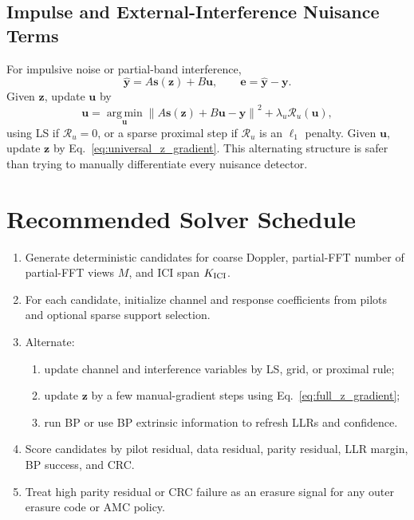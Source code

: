 \documentclass[11pt]{article}
\newcommand{\norm}[1]{\left\lVert #1 \right\rVert}
\newcommand{\argmin}{\operatorname*{arg\,min}}
\begin{document}
\subsection{Impulse and External-Interference Nuisance Terms}

For impulsive noise or partial-band interference,
\begin{equation}
  \widehat{\bm y}=A\bm s(\bm z)+B\bm u,\qquad
  \bm e=\widehat{\bm y}-\bm y.
\end{equation}
Given $\bm z$, update $\bm u$ by
\begin{equation}
  \bm u
  =
  \argmin_{\bm u}\norm{A\bm s(\bm z)+B\bm u-\bm y}^2
  +\lambda_u\mathcal R_u(\bm u),
\end{equation}
using LS if $\mathcal R_u=0$, or a sparse proximal step if $\mathcal R_u$ is an
$\ell_1$ penalty.  Given $\bm u$, update $\bm z$ by
Eq.~\eqref{eq:universal_z_gradient}.  This alternating structure is safer than
trying to manually differentiate every nuisance detector.

\section{Recommended Solver Schedule}

\begin{enumerate}
  \item Generate deterministic candidates for coarse Doppler, partial-FFT
  number of partial-FFT views $M$, and ICI span $K_{\rm ICI}$.
  \item For each candidate, initialize channel and response coefficients from pilots
  and optional sparse support selection.
  \item Alternate:
  \begin{enumerate}
    \item update channel and interference variables by LS, grid, or proximal
    rule;
    \item update $\bm z$ by a few manual-gradient steps using
    Eq.~\eqref{eq:full_z_gradient};
    \item run BP or use BP extrinsic information to refresh LLRs and confidence.
  \end{enumerate}
  \item Score candidates by pilot residual, data residual, parity residual,
  LLR margin, BP success, and CRC.
  \item Treat high parity residual or CRC failure as an erasure signal for any
  outer erasure code or AMC policy.
\end{enumerate}
\end{document}
